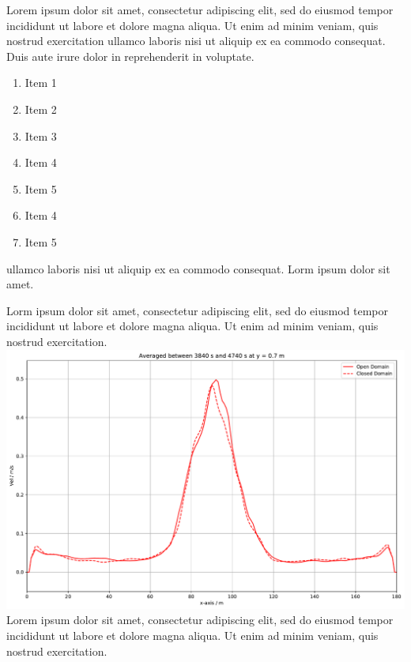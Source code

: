 \documentclass[12pt]{article}
\begin{document}
%
\vspace{0.4cm}
%
\begin{multicols*}{2}


Lorem ipsum dolor sit amet, consectetur adipiscing elit, sed do eiusmod tempor incididunt ut labore et dolore magna aliqua. Ut enim ad minim veniam, quis nostrud exercitation ullamco laboris nisi ut aliquip ex ea commodo consequat. Duis aute irure dolor in reprehenderit in voluptate.
\begin{enumerate}
\itemsep0em
\item Item 1
\item Item 2
\item Item 3
\item Item 4
\item Item 5
\item Item 4
\item Item 5
\end{enumerate}
ullamco laboris nisi ut aliquip ex ea commodo consequat. Lorm ipsum dolor sit amet.



\columnbreak



Lorm ipsum dolor sit amet, consectetur adipiscing elit, sed do eiusmod tempor incididunt ut labore et dolore magna aliqua. Ut enim ad minim veniam, quis nostrud exercitation.
\includegraphics[width=\columnwidth]{img/example.pdf}
Lorem ipsum dolor sit amet, consectetur adipiscing elit, sed do eiusmod tempor incididunt ut labore et dolore magna aliqua. Ut enim ad minim veniam, quis nostrud exercitation.



\end{multicols*}
\end{document}
